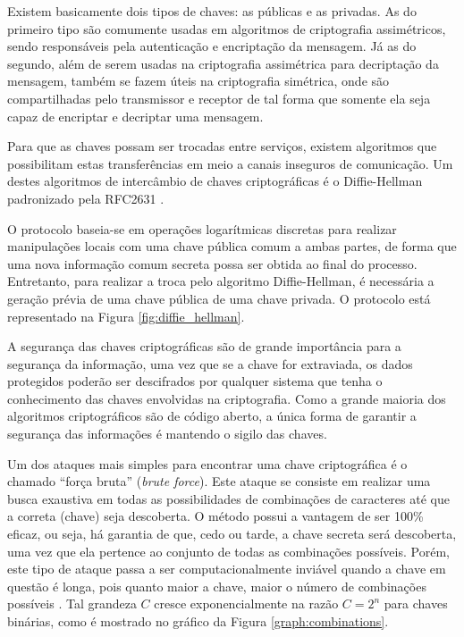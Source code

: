 \documentclass[a4paper,10pt,oneside,conference,final,keeplastbox]{inatel}
\begin{document}
            Existem basicamente dois tipos de chaves: as públicas e as privadas. As do primeiro tipo são comumente usadas em algoritmos de criptografia assimétricos, sendo responsáveis pela autenticação e encriptação da mensagem. Já as do segundo, além de serem usadas na criptografia assimétrica para decriptação da mensagem, também se fazem úteis na criptografia simétrica, onde são compartilhadas pelo transmissor e receptor de tal forma que somente ela seja capaz de encriptar e decriptar uma mensagem.
            
            Para que as chaves possam ser trocadas entre serviços, existem algoritmos que possibilitam estas transferências em meio a canais inseguros de comunicação. Um destes algoritmos de intercâmbio de chaves criptográficas é o Diffie-Hellman padronizado pela RFC2631 \cite{rescorla1999diffie}.
            
            O protocolo baseia-se em operações logarítmicas discretas para realizar manipulações locais com uma chave pública comum a ambas partes, de forma que uma nova informação comum secreta possa ser obtida ao final do processo. Entretanto, para realizar a troca pelo algoritmo Diffie-Hellman, é necessária a geração prévia de uma chave pública de uma chave privada. O protocolo está representado na Figura \ref{fig:diffie_hellman}.
            
            
            
            A segurança das chaves criptográficas são de grande importância para a segurança da informação, uma vez que se a chave for extraviada, os dados protegidos poderão ser descifrados por qualquer sistema que tenha o conhecimento das chaves envolvidas na criptografia. Como a grande maioria dos algoritmos criptográficos são de código aberto, a única forma de garantir a segurança das informações é mantendo o sigilo das chaves.
            
            Um dos ataques mais simples para encontrar uma chave criptográfica é o chamado ``força bruta'' (\textit{brute force}). Este ataque se consiste em realizar uma busca exaustiva em todas as possibilidades de combinações de caracteres até que a correta (chave) seja descoberta. O método possui a vantagem de ser 100\% eficaz, ou seja, há garantia de que, cedo ou tarde, a chave secreta será descoberta, uma vez que ela pertence ao conjunto de todas as combinações possíveis. Porém, este tipo de ataque passa a ser computacionalmente inviável quando a chave em questão é longa, pois quanto maior a chave, maior o número de combinações possíveis \cite{stinson2006cryptography}. Tal grandeza $C$ cresce exponencialmente na razão $C = 2^n$ para chaves binárias, como é mostrado no gráfico da Figura \ref{graph:combinations}.
            
\end{document}
